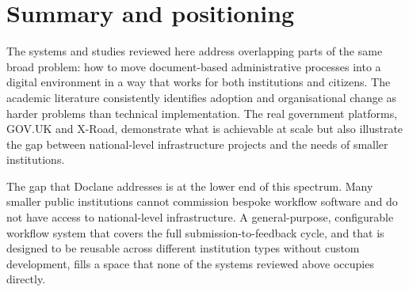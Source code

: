 
\section{Summary and positioning}

\par The systems and studies reviewed here address overlapping parts of the same broad problem: how to move document-based administrative processes into a digital environment in a way that works for both institutions and citizens. The academic literature consistently identifies adoption and organisational change as harder problems than technical implementation. The real government platforms, GOV.UK and X-Road, demonstrate what is achievable at scale but also illustrate the gap between national-level infrastructure projects and the needs of smaller institutions.

\par The gap that Doclane addresses is at the lower end of this spectrum. Many smaller public institutions cannot commission bespoke workflow software and do not have access to national-level infrastructure. A general-purpose, configurable workflow system that covers the full submission-to-feedback cycle, and that is designed to be reusable across different institution types without custom development, fills a space that none of the systems reviewed above occupies directly.